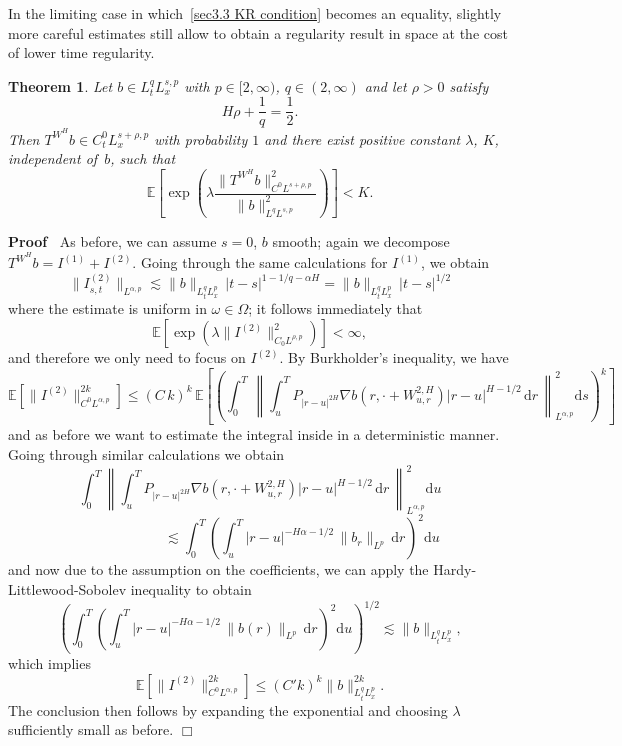 \documentclass[10pt]{article}
\newcommand{\mathd}{\mathrm{d}}
\newenvironment{proof}{\noindent\textbf{Proof\ }}{\hspace*{\fill}$\Box$\medskip}
\newtheorem{theorem}{Theorem}
\begin{document}
In the limiting case in which~{\eqref{sec3.3 KR condition}} becomes an
equality, slightly more careful estimates still allow to obtain a regularity
result in space at the cost of lower time regularity.

\begin{theorem}
  \label{sec3.3 thm threshold bessel}Let $b \in L^q_t L^{s, p}_x$ with $p \in
  [2, \infty)$, $q \in (2, \infty)$ and let $\rho > 0$ satisfy
  \begin{equation}
    H \rho + \frac{1}{q} = \frac{1}{2} \label{sec3.3 threshold coefficient} .
  \end{equation}
  Then $T^{W^H} b \in C^0_t L_x^{s + \rho, p}$ with probability $1$ and there
  exist positive constant $\lambda$, $K$, independent of~$b$, such that
  \begin{equation*}
    \mathbb{E} \left[ \exp \left( \lambda \frac{\| T^{W^H} b \|^2_{C^0 L^{s +
    \rho, p}}}{\| b \|^2_{L^q L^{s, p}}} \right) \right] < K.
  \end{equation*}
\end{theorem}

\begin{proof}
  As before, we can assume $s = 0$, $b$ smooth; again we decompose $T^{W^H} b
  = I^{(1)} + I^{(2)}$. Going through the same calculations for $I^{(1)}$, we
  obtain
  \[ \| I_{s, t}^{(2)} \|_{L^{\alpha, p}} \lesssim \| b \|_{L^q_t L^p_x} \, |
     t - s |^{1 - 1 / q - \alpha H} = \| b \|_{L^q_t L^p_x} \, | t - s |^{1 /
     2} \]
  where the estimate is uniform in $\omega \in \Omega$; it follows immediately
  that
  \[ \mathbb{E} [\exp (\lambda \| I^{(2)} \|_{C_0 L^{\rho, p}}^2)] < \infty,
  \]
  and therefore we only need to focus on $I^{(2)}$. By Burkholder's
  inequality, we have
  \[ \mathbb{E} [\| I^{(2)} \|_{C^0 L^{\alpha, p}}^{2 k}] \leqslant \left( C
     \, k \right)^k \, \mathbb{E} \left[ \left( \int_0^T \, \left\| \int_u^T
     P_{| r - u |^{2 H}} \nabla b (r, \cdot + W^{2, H}_{u, r}) | r - u |^{H -
     1 / 2} \, \mathd r \, \right\|^2_{L^{\alpha, p}} \mathd s \right)^k
     \right] \]
  and as before we want to estimate the integral inside in a deterministic
  manner. Going through similar calculations we obtain
  \[ \int_0^T \left\| \int_u^T P_{| r - u |^{2 H}} \nabla b (r, \cdot + W^{2,
     H}_{u, r}) | r - u |^{H - 1 / 2} \, \mathd r \, \right\|^2_{L^{\alpha,
     p}} \mathd u \]
  \[ \qquad \qquad \qquad \lesssim \int_0^T \left( \int_u^T | r - u |^{- H
     \alpha - 1 / 2} \, \| b_r \|_{L^p} \, \mathd r_{} \right)^2 \mathd u \]
  and now due to the assumption on the coefficients, we can apply the
  Hardy\mbox{-}Littlewood\mbox{-}Sobolev inequality to obtain
  \[ \left( \int_0^T \left( \int_u^T | r - u |^{- H \alpha - 1 / 2} \, \| b
     (r) \|_{L^p} \, \mathd r_{} \right)^2 \mathd u \right)^{1 / 2} \lesssim
     \| b \|_{L^q_t L^p_x}, \]
  which implies
  \[ \mathbb{E} [\| I^{(2)} \|_{C^0 L^{\alpha, p}}^{2 k}] \leqslant (C' k)^k
     \| b \|^{2 k}_{L^q_t L^p_x} . \]
  The conclusion then follows by expanding the exponential and choosing
  $\lambda$ sufficiently small as before.
\end{proof}
\end{document}
